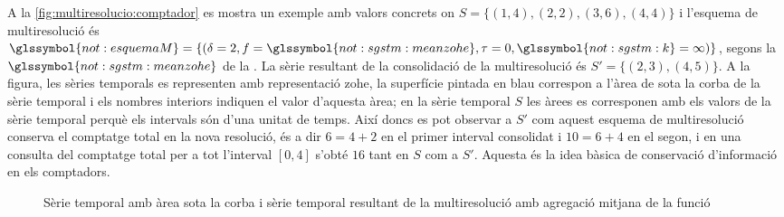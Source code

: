 \begin{itemize}
    A la \autoref{fig:multiresolucio:comptador} es mostra un exemple
    amb valors concrets on $S=\{ (1,4),(2,2),(3,6),(4,4)\}$ i
    l'esquema de multiresolució és
    $\glssymbol{not:esquemaM}=\{(\delta=2,f=\glssymbol{not:sgstm:meanzohe},\tau=0,\glssymbol{not:sgstm:k}=\infty)\}$,
    segons la $\glssymbol{not:sgstm:meanzohe}$ de la
    . La sèrie resultant de la
    consolidació de la multiresolució és $S'=\{ (2,3),(4,5)\}$. A la
    figura, les sèries temporals es representen amb representació
    \gls{zohe}, la superfície pintada en blau correspon a l'àrea de
    sota la corba de la sèrie temporal i els nombres interiors
    indiquen el valor d'aquesta àrea; en la sèrie temporal $S$ les
    àrees es corresponen amb els valors de la sèrie temporal perquè
    els intervals són d'una unitat de temps. Així doncs es pot
    observar a $S'$ com aquest esquema de multiresolució conserva el
    comptatge total en la nova resolució, és a dir $6=4+2$ en el
    primer interval consolidat i $10=6+4$ en el segon, i en una
    consulta del comptatge total per a tot l'interval $[0,4]$ s'obté
    $16$ tant en $S$ com a $S'$. Aquesta és la idea bàsica de
    conservació d'informació en els comptadors.



\begin{figure}[tp]
  \centering


     \qquad


      \caption{Sèrie temporal amb àrea sota la corba i sèrie temporal
        resultant de la multiresolució amb agregació mitjana de la
        funció}
  \label{fig:multiresolucio:comptador}
\end{figure}






  \end{itemize}
